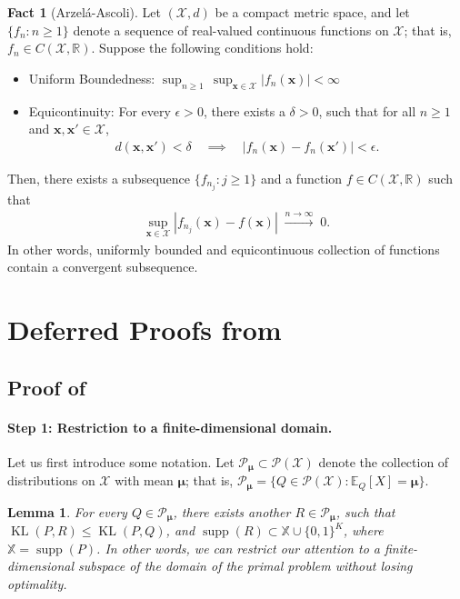 \documentclass{article}
\theoremstyle{plain}
\newtheorem{lemma}[lemma]{Lemma}
\theoremstyle{definition}
\newtheorem{fact}[fact]{Fact}
\newcommand{\KL}{\operatorname{KL}}
\newcommand{\R}{\mathbb{R}}
\newcommand{\calP}{\mathcal P}
\newcommand{\calX}{\mathcal X}
\newcommand{\xvec}{\mathbf{x}}
\newcommand{\boldmu}{\boldsymbol{\mu}}
\DeclareMathOperator{\supp}{supp}
\newcommand{\finitesupport}{\mathbb{X}}
\begin{document}
\begin{fact}[Arzel\'a-Ascoli]
    \label{fact:arzela-ascoli}
    Let $(\calX, d)$ be a compact metric space, and let $\{f_n: n \geq 1\}$ denote a sequence of real-valued continuous functions on $\calX$; that is, $f_n \in C(\calX, \mathbb{R})$. Suppose the following conditions hold: 
    \begin{itemize}
        \item Uniform Boundedness: $\sup_{n \geq 1} \, \sup_{ \xvec \in \calX} |f_n(\xvec)| < \infty$
        \item Equicontinuity: For every $\epsilon>0$, there exists a $\delta>0$, such that for all $n \geq 1$ and $\xvec, \xvec' \in \calX$, 
        \begin{align}
            d(\xvec, \xvec') < \delta \quad \implies \quad 
            |f_n(\xvec) - f_n(\xvec')| < \epsilon. 
        \end{align}
    \end{itemize}
    Then, there exists a subsequence $\{f_{n_j}: j \geq 1\}$ and a function $f \in C(\calX, \R)$ such that 
    \begin{align}
        \sup_{\xvec \in \calX} |f_{n_j}(\xvec) - f(\xvec)| \; \overset{n \to \infty}{\longrightarrow} \; 0. 
    \end{align}
    In other words, uniformly bounded and equicontinuous collection of functions contain a convergent subsequence. 
\end{fact}




\section{Deferred Proofs from~}

\subsection{Proof of~}
\label{proof:finite-support}


\paragraph{Step 1: Restriction to a finite-dimensional domain.} Let us first introduce some notation. Let $\calP_{\boldmu} \subset \calP(\calX)$ denote the collection of distributions on $\calX$ with mean $\boldmu$; that is, $\calP_{\boldmu} = \{Q \in \calP(\calX): \mathbb{E}_Q[X] = \boldmu\}$. 
\begin{lemma}
    \label{lemma:discrete-proof-1} For every $Q \in \calP_{\boldmu}$, there exists another $R \in \calP_{\boldmu}$, such that $\KL(P, R) \leq \KL(P, Q)$, and $\supp(R) \subset \finitesupport \cup \{0, 1\}^K$, where $\finitesupport = \supp(P)$. In other words, we can restrict our attention to a finite-dimensional subspace of the domain of the primal problem without losing optimality. 
\end{lemma}
\end{document}
